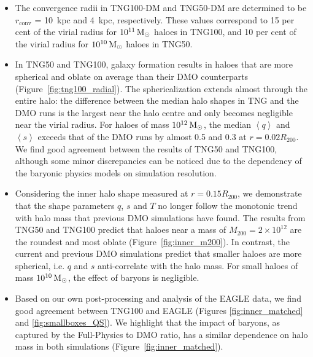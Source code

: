 \documentclass[fleqn,usenatbib]{mnras}
\def\msun{\,\rm M_{\odot}}
\begin{document}
\begin{itemize}

\item 
The convergence radii in TNG100-DM and TNG50-DM are determined to be $r_\text{conv}$ = 10~kpc and 4~kpc, respectively.
These values correspond to 15 per cent of the virial radius for $10^{11} \msun$ haloes in TNG100, and 10 per cent of the virial radius for $10^{10} \msun$ haloes in TNG50.\\


\item 
In TNG50 and TNG100, galaxy formation results in haloes that are more spherical and oblate on average than their DMO counterparts (Figure~\ref{fig:tng100_radial}).
The sphericalization extends almost through the entire halo: the difference between the median halo shapes in TNG and the DMO runs is the largest near the halo centre and only becomes negligible near the virial radius.
For haloes of mass $10^{12} \msun$, the median $\left<q\right>$ and $\left< s \right>$ exceeds that of the DMO runs by almost 0.5 and 0.3 at $r = 0.02 R_{200}$.
We find good agreement between the results of TNG50 and TNG100, although some minor discrepancies can be noticed due to the dependency of the baryonic physics models on simulation resolution.\\


\item 
Considering the inner halo shape measured at $r=0.15R_{200}$, we demonstrate that the shape parameters $q$, $s$ and $T$ no longer follow the monotonic trend with halo mass that previous DMO simulations have found.
The results from TNG50 and TNG100 predict that haloes near a mass of $M_{200} = 2 \times 10^{12}$ are the roundest and most oblate (Figure~\ref{fig:inner_m200}).
In contrast, the current and previous DMO simulations predict that smaller haloes are more spherical,  i.e. $q$ and $s$ anti-correlate with the halo mass.
For small haloes of mass $10^{10} \msun$, the effect of baryons is negligible.\\


\item 
Based on our own post-processing and analysis of the EAGLE data, we find good agreement between TNG100 and EAGLE (Figures \ref{fig:inner_matched} and \ref{fig:smallboxes_QS}).
We highlight that the impact of baryons, as captured by the Full-Physics to DMO ratio, has a similar dependence on halo mass in both simulations (Figure~\ref{fig:inner_matched}). 
\\


\end{itemize}
\end{document}
